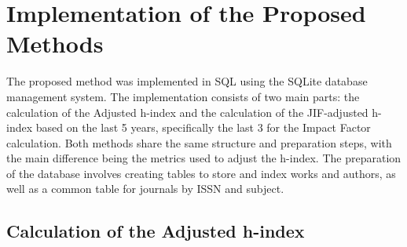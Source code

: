 \section{Implementation of the Proposed Methods}
%
%
%
%

The proposed method was implemented in SQL using the SQLite database management
system. The implementation consists of two main parts: the calculation of the
Adjusted h-index and the calculation of the JIF-adjusted h-index based on the
last 5 years, specifically the last 3 for the Impact Factor calculation. Both
methods share the same structure and preparation steps, with the main
difference being the metrics used to adjust the h-index. The preparation of the
database involves creating tables to store and index works and authors, as well
as a common table for journals by ISSN and subject.

\subsection{Calculation of the Adjusted h-index}

